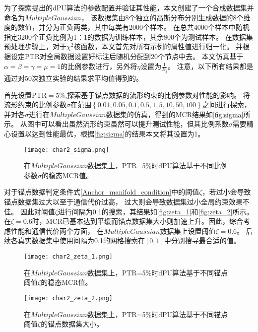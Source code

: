 为了探索提出的dPU算法的参数配置并验证其性能，本文创建了一个合成数据集并命名为$MultipleGaussian$，
该数据集由8个独立的高斯分布分别生成数据的8个维度的数值，并分为正负两类，其中每类有2000个样本。
在总共4000个样本中随机指定3200个正负比例为1：1的数据为训练样本，其余800个为测试样本。
在数据集预处理步骤上，对于$\chi^2$核函数，本文首先对所有示例的属性值进行归一化。
并根据设定PTR对全局数据设置好标注后随机分配到20个节点中去。
本文仿真基于$\alpha=\beta=\gamma=\mu=1$的比例参数进行，另外将$\eta$设置为$\frac{1}{E_j}$。
注意，以下所有结果都是通过对50次独立实验的结果求平均值得到的。

首先设置$\text{PTR}=5\%$,探索基于锚点数据的流形约束的比例参数对性能的影响。
将流形约束的比例参数$\sigma$在范围$\left\{0.01, 0.05, 0.1, 0.5, 1, 5, 10, 50, 100\right\}$之间进行探索，并对各$\sigma$进行在$MultipleGaussian$数据集的仿真，得到的MCR结果如\autoref{fig:sigma}所示。
从图中可以看出虽然流形约束虽然可以提升测试性能，但其比例系数$\sigma$需要精心设置以达到性能最优，根据\autoref{fig:sigma}的结果本文将其设置为1。
\begin{figure}
    \centering
    \texttt{[image: char2\_sigma.png]}
    \caption{\label{fig:sigma}在$MultipleGaussian$数据集上，PTR=5\%时dPU算法基于不同比例参数$\sigma$的稳态MCR值。}
\end{figure}

对于锚点数据判定条件式\eqref{Anchor_manifold_condition}中的阈值$\zeta$，若过小会导致锚点数据集过大以至于通信代价过高，
过大则会导致数据集过小全局约束效果不佳。
因此对阈值$\zeta$进行间隔为0.1的搜索，其结果如\autoref{fig:zeta_1}和\autoref{fig:zeta_2}所示。在$\zeta=0.6$时，MCR已基本达到平缓而锚点数据集大小则加速上升。因此，综合考虑性能和通信代价两个方面，
在$MultipleGaussian$数据集上设置阈值$\zeta=0.6$。
后续各真实数据集中使用间隔为0.1的网格搜索在$\left[0,1\right]$中分别搜寻最合适的值。
\begin{figure}
    \centering
    \texttt{[image: char2\_zeta\_1.png]}
    \caption{\label{fig:zeta_1}在$MultipleGaussian$数据集上，PTR=5\%时dPU算法基于不同锚点阈值$\zeta$的稳态MCR值。}
\end{figure}
\begin{figure}
    \centering
    \texttt{[image: char2\_zeta\_2.png]}
    \caption{\label{fig:zeta_2}在$MultipleGaussian$数据集上，PTR=5\%时dPU算法基于不同锚点阈值$\zeta$的锚点数据集大小。}
\end{figure}


